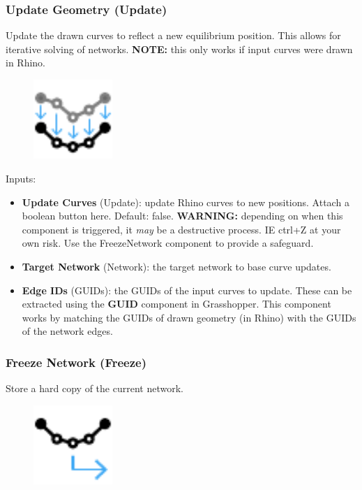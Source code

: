 \subsubsection{Update Geometry (Update)}\label{Update}
Update the drawn curves to reflect a new equilibrium position. This allows for iterative solving of networks. {\color{kpink} \textbf{NOTE:} this only works if input curves were drawn in Rhino}.

\begin{figure}[h]
    \centering
    \includegraphics[width=3cm]{Figures/update}
\end{figure}

Inputs:
\begin{itemize}
    \setlength\itemsep{0.05em}
    \item \textbf{Update Curves} (Update): update Rhino curves to new positions. Attach a boolean button here. {\color{gray}Default: false}. {\color{kpink}\textbf{WARNING:} depending on when this component is triggered, it \textit{may} be a destructive process. IE ctrl+Z at your own risk. Use the FreezeNetwork component to provide a safeguard.}
    \item \textbf{Target Network} (Network): the target network to base curve updates.
    \item \textbf{Edge IDs} (GUIDs): the GUIDs of the input curves to update. These can be extracted using the \textbf{GUID} component in Grasshopper. This component works by matching the GUIDs of drawn geometry (in Rhino) with the GUIDs of the network edges.
\end{itemize}

\subsubsection{Freeze Network (Freeze)}\label{Freeze}
Store a hard copy of the current network.

\begin{figure}[h]
    \centering
    \includegraphics[width=3cm]{Figures/export}
\end{figure}

